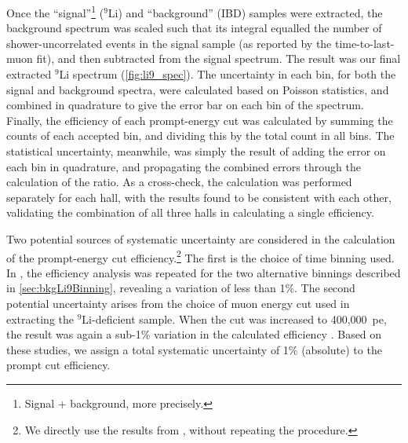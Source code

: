 \documentclass[../thesis.tex]{subfiles}
\begin{document}
Once the ``signal''\footnote{Signal + background, more precisely.} ($^9$Li) and ``background'' (IBD) samples were extracted, the background spectrum was scaled such that its integral equalled the number of shower-uncorrelated events in the signal sample (as reported by the time-to-last-muon fit), and then subtracted from the signal spectrum. The result was our final extracted $^9$Li spectrum (\autoref{fig:li9_spec}). The uncertainty in each bin, for both the signal and background spectra, were calculated based on Poisson statistics, and combined in quadrature to give the error bar on each bin of the spectrum. Finally, the efficiency of each prompt-energy cut was calculated by summing the counts of each accepted bin, and dividing this by the total count in all bins. The statistical uncertainty, meanwhile, was simply the result of adding the error on each bin in quadrature, and propagating the combined errors through the calculation of the ratio. As a cross-check, the calculation was performed separately for each hall, with the results found to be consistent with each other, validating the combination of all three halls in calculating a single efficiency.

Two potential sources of systematic uncertainty are considered in the calculation of the prompt-energy cut efficiency.\footnote{We directly use the results from \cite{ChrisLi9}, without repeating the procedure.} The first is the choice of time binning used. In \cite{ChrisLi9}, the efficiency analysis was repeated for the two alternative binnings described in \autoref{sec:bkgLi9Binning}, revealing a variation of less than 1\%. The second potential uncertainty arises from the choice of muon energy cut used in extracting the $^9$Li-deficient sample. When the cut was increased to 400,000~pe, the result was again a sub-1\% variation in the calculated efficiency \cite{ChrisLi9}. Based on these studies, we assign a total systematic uncertainty of 1\% (absolute) to the prompt cut efficiency.
\end{document}
